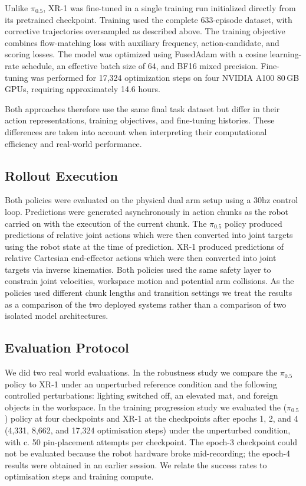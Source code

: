 \documentclass[10pt,twocolumn,letterpaper]{article}
\begin{document}
Unlike $\pi_{0.5}$, XR-1 was fine-tuned in a single training run initialized directly from its pretrained checkpoint. Training used the complete 633-episode dataset, with corrective trajectories oversampled as described above. The training objective combines flow-matching loss with auxiliary frequency, action-candidate, and scoring losses. The model was optimized using FusedAdam with a cosine learning-rate schedule, an effective batch size of 64, and BF16 mixed precision. Fine-tuning was performed for 17,324 optimization steps on four NVIDIA A100 80\,GB GPUs, requiring approximately 14.6 hours.

Both approaches therefore use the same final task dataset but differ in their action representations, training objectives, and fine-tuning histories. These differences are taken into account when interpreting their computational efficiency and real-world performance.

\subsection{Rollout Execution}
Both policies were evaluated on the physical dual arm setup using a 30hz control loop. Predictions were generated asynchronously in action chunks as the robot carried on with the execution of the current chunk. The $\pi_{0.5}$ policy produced predictions of relative joint actions which were then converted into joint targets using the robot state at the time of prediction. XR-1 produced predictions of relative Cartesian end-effector actions which were then converted into joint targets via inverse kinematics. Both policies used the same safety layer to constrain joint velocities, workspace motion and potential arm collisions. As the policies used different chunk lengths and transition settings we treat the results as a comparison of the two deployed systems rather than a comparison of two isolated model architectures.

\subsection{Evaluation Protocol}
We did two real world evaluations. In the robustness study we compare the $\pi_{0.5}$ policy to XR-1 under an unperturbed reference condition and the following controlled perturbations: lighting switched off, an elevated mat, and foreign objects in the workspace. In the training progression study we evaluated the ($\pi_{0.5}$) policy at four checkpoints and XR-1 at the checkpoints after epochs 1, 2, and 4 (4,331, 8,662, and 17,324 optimisation steps) under the unperturbed condition, with c. 50 pin-placement attempts per checkpoint. The epoch-3 checkpoint could not be evaluated because the robot hardware broke mid-recording; the epoch-4 results were obtained in an earlier session. We relate the success rates to optimisation steps and training compute.
\end{document}
